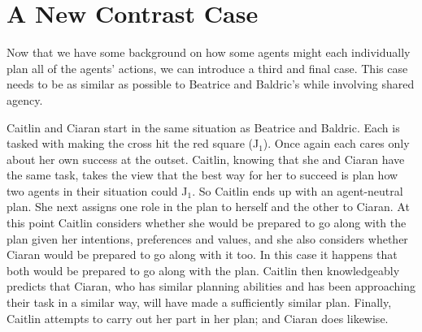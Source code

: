 \documentclass[12pt,\papersize]{extarticle}
\begin{document}
	
	
\section{A New Contrast Case}
\label{sec:new_contrast_case}
Now that we have some background on how some agents might each individually plan all of the agents' actions,
we can introduce a third and final case.
This case needs to be as similar as possible to Beatrice and Baldric's while involving shared agency.

Caitlin and Ciaran start in the same situation as Beatrice and Baldric. 
Each is tasked with making the cross hit the red square (J$_1$). 
Once again each cares only about her own success at the outset. 
Caitlin, knowing that she and Ciaran have the same task, takes the view that the best way for her to succeed is plan how two agents in their situation could J$_1$.  
So Caitlin ends up with an agent-neutral plan.
She next assigns one role in the plan to herself and the other to Ciaran.
At this point Caitlin considers whether she would be prepared to go along with the plan given her intentions, preferences and values, and she also considers whether Ciaran would be prepared to go along with it too. 
In this case it happens that both would be prepared to go along with the plan.
Caitlin then knowledgeably predicts that Ciaran, who has similar planning abilities and has been approaching their task in a similar way, will have made a sufficiently similar plan.
Finally, Caitlin attempts to carry out her part in her plan; and Ciaran does likewise.
\end{document}
